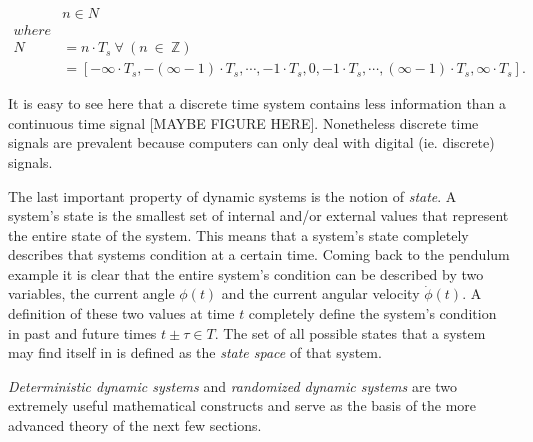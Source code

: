 \begin{align}
&n \in N \nonumber \\
where& \nonumber \\
N &= n\cdot T_s\ \forall\ (n\ \in\ \mathbb{Z}) \nonumber \\
  &= [-\infty \cdot T_s,-(\infty  -1) \cdot T_s,\cdots,-1 \cdot T_s,0,-1 \cdot T_s,\cdots,(\infty-1) \cdot T_s,\infty \cdot T_s]. \nonumber
\end{align}

It is easy to see here that a discrete time system contains less information than a continuous time signal [MAYBE FIGURE HERE]. Nonetheless discrete time signals are prevalent because computers can only deal with digital (ie. discrete) signals.



The last important property of dynamic systems is the notion of \textit{state}. A system's state is the smallest set of internal and/or external values that represent the entire state of the system. This means that a system's state completely describes that systems condition at a certain time. Coming back to the pendulum example it is clear that the entire system's condition can be described by two variables, the current angle $\phi(t)$ and the current angular velocity $\dot{\phi}(t)$. A definition of these two values at time $t$ completely define the system's condition in past and future times $t\pm\tau \in T$. The set of all possible states that a system may find itself in is defined as the \textit{state space} of that system.

\textit{Deterministic dynamic systems} and \textit{randomized dynamic systems} are two extremely useful mathematical constructs and serve as the basis of the more advanced theory of the next few sections.



